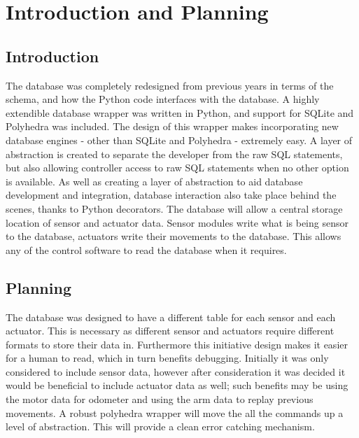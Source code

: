 \section{Introduction and Planning}
\subsection{Introduction}
The database was completely redesigned from previous years in terms of the schema, and how the Python code interfaces with the database.
A highly extendible database wrapper was written in Python, and support for SQLite and Polyhedra was included. The design of this wrapper makes incorporating new database engines - other than SQLite and Polyhedra - extremely easy.
\newline
A layer of abstraction is created to separate the developer from the raw SQL statements, but also allowing controller access to raw SQL statements when no other option is available.
As well as creating a layer of abstraction to aid database development and integration, database interaction also take place behind the scenes, thanks to Python decorators.
\newline
The database will allow a central storage location of sensor and actuator data. Sensor modules write what is being sensor to the database, actuators write their movements to the database. This allows any of the control software to read the database when it requires. 

\subsection{Planning}
The database was designed to have a different table for each sensor and each actuator. This is necessary as different sensor and actuators require different formats to store their data in. Furthermore this initiative design makes it easier for a human to read, which in turn benefits debugging. 
Initially it was only considered to include sensor data, however after consideration it was decided it would be beneficial to include actuator data as well; such benefits may be using the motor data for odometer and using the arm data to replay previous movements.
A robust polyhedra wrapper will move the all the commands up a level of abstraction. This will provide a clean error catching mechanism.



